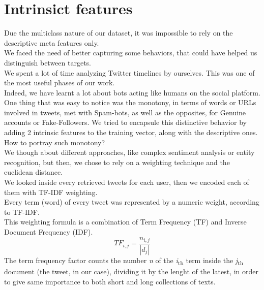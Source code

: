 \section{Intrinsict features}
Due the multiclass nature of our dataset, it was impossible to rely on the descriptive meta features only.\\
We faced the need of better capturing some behaviors, that could have helped us distinguish between targets.\\
We spent a lot of time analyzing Twitter timelines by ourselves. This was one of the most useful phases of our work.\\
Indeed, we have learnt a lot about bots acting like humans on the social platform.
One thing that was easy to notice was the monotony, in terms of words or URLs involved in tweets,  met with Spam-bots, as well as the opposites, for Genuine accounts or Fake-Followers.
We tried to encapsule this distinctive behavior by adding 2 intrinsic features to the training vector, along with the descriptive ones.\\
How to portray such monotony?\\
We though about different approaches, like complex sentiment analysis or entity recognition, but then, we chose to rely on a weighting technique and the euclidean distance.\\
We looked inside every retrieved tweets for each user, then we encoded each of them with TF-IDF weighting.\\
Every term (word) of every tweet was represented by a numeric weight, according to TF-IDF.\\
This weighting formula is a combination of Term Frequency (TF) and Inverse Document Frequency (IDF).
\[ TF_{i,j} =\frac {n_{i,j}}{|d_{j}|} \]
The term frequency factor counts the number \textit{n} of the \textit{i}\textsubscript{th} term inside the \textit{j}\textsubscript{th} document (the tweet, in our case), dividing it by the lenght of the latest, in order to give same importance to both short and long collections of texts.

